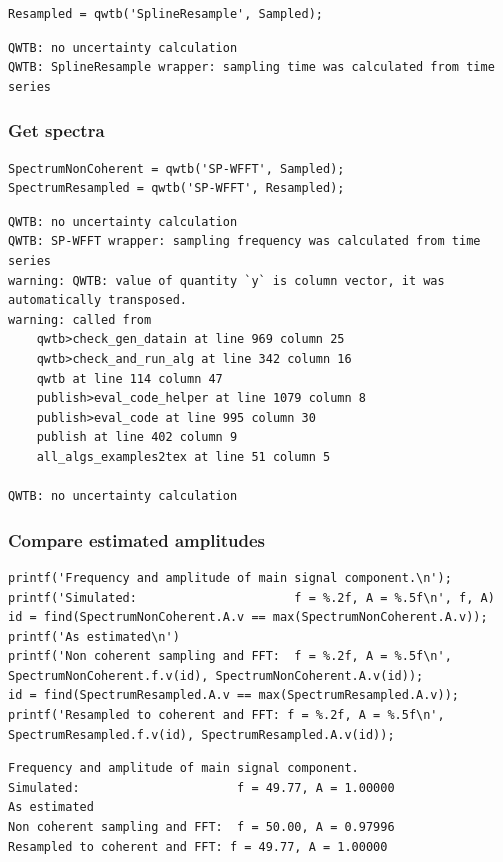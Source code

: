 \begin{lstlisting}
Resampled = qwtb('SplineResample', Sampled);
\end{lstlisting}
\begin{lstlisting}[language={},xleftmargin=5pt,frame=none]
QWTB: no uncertainty calculation
QWTB: SplineResample wrapper: sampling time was calculated from time series

\end{lstlisting}


{}
\subsubsection*{Get spectra}

\begin{lstlisting}
SpectrumNonCoherent = qwtb('SP-WFFT', Sampled);
SpectrumResampled = qwtb('SP-WFFT', Resampled);
\end{lstlisting}
\begin{lstlisting}[language={},xleftmargin=5pt,frame=none]
QWTB: no uncertainty calculation
QWTB: SP-WFFT wrapper: sampling frequency was calculated from time series
warning: QWTB: value of quantity `y` is column vector, it was automatically transposed.
warning: called from
    qwtb>check_gen_datain at line 969 column 25
    qwtb>check_and_run_alg at line 342 column 16
    qwtb at line 114 column 47
    publish>eval_code_helper at line 1079 column 8
    publish>eval_code at line 995 column 30
    publish at line 402 column 9
    all_algs_examples2tex at line 51 column 5
 
QWTB: no uncertainty calculation

\end{lstlisting}


{}
\subsubsection*{Compare estimated amplitudes}

\begin{lstlisting}
printf('Frequency and amplitude of main signal component.\n');
printf('Simulated:                      f = %.2f, A = %.5f\n', f, A)
id = find(SpectrumNonCoherent.A.v == max(SpectrumNonCoherent.A.v));
printf('As estimated\n')
printf('Non coherent sampling and FFT:  f = %.2f, A = %.5f\n', SpectrumNonCoherent.f.v(id), SpectrumNonCoherent.A.v(id));
id = find(SpectrumResampled.A.v == max(SpectrumResampled.A.v));
printf('Resampled to coherent and FFT: f = %.2f, A = %.5f\n', SpectrumResampled.f.v(id), SpectrumResampled.A.v(id));
\end{lstlisting}
\begin{lstlisting}[language={},xleftmargin=5pt,frame=none]
Frequency and amplitude of main signal component.
Simulated:                      f = 49.77, A = 1.00000
As estimated
Non coherent sampling and FFT:  f = 50.00, A = 0.97996
Resampled to coherent and FFT: f = 49.77, A = 1.00000

\end{lstlisting}


